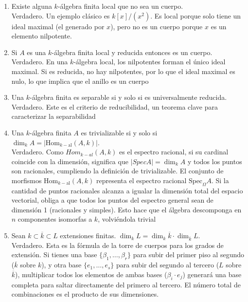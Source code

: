\begin{enumerate}
    Verdadero. Esta afirmación es la conocida ``Fórmula de los puntos'' al hacer un cambio de base a $L$. Dar el morfismo $Hom_{k-alg}(A,L) \simeq Hom_{L-alg}(A\underset{k}{\otimes} L , L)$, y demostrar que $Hom_{k-alg}(A, k) = $ puntos racionales de $A$.  
    \item Existe alguna $k$-álgebra finita local que no sea un cuerpo. \\
    Verdadero. Un ejemplo clásico es $k[x]/(x^2)$. Es local porque solo tiene un ideal maximal (el generado por $x$), pero no es un cuerpo porque $x$ es un elemento nilpotente.
    \item Si $A$ es una $k$-álgebra finita local y reducida entonces es un cuerpo. \\
    Verdadero. En una $k$-álgebra local, los nilpotentes forman el único ideal maximal. Si es reducida, no hay nilpotentes, por lo que el ideal maximal es nulo, lo que implica que el anillo es un cuerpo
    \item Una $k$-álgebra finita es separable si y solo si es universalmente reducida. \\ 
    Verdadero. Este es el criterio de reducibilidad, un teorema clave para caracterizar la separabilidad
    \item Una $k$-álgebra finita $A$ es trivializable si y solo si $\dim_{k}A = |\text{Hom}_{k-\text{al}}(A,k)|$. \\
    Verdadero. Como $Hom_{k-al}(A, k)$ es el espectro racional, si su cardinal coincide con la dimensión, significa que $|Spec A| = \dim_k A$ y todos los puntos son racionales, cumpliendo la definición de trivializable. El conjunto de morfismos $\text{Hom}_{k-\text{al}}(A,k)$ representa el espectro racional $\text{Spec}_{\Omega} A$. Si la cantidad de puntos racionales alcanza a igualar la dimensión total del espacio vectorial, obliga a que todos los puntos del espectro general sean de dimensión 1 (racionales y simples). Esto hace que el álgebra descomponga en $n$ componentes isomorfas a $k$, volviéndola trivial
    \item Sean $k \subset \overline{k} \subset L$ extensiones finitas. $\dim_{k}L = \dim_{k}\overline{k} \cdot \dim_{\overline{k}}L$. \\
    Verdadero. Esta es la fórmula de la torre de cuerpos para los grados de extensión. Si tienes una base $\{\beta_1, \dots, \beta_r\}$ para subir del primer piso al segundo ($\overline{k}$ sobre $k$), y otra base $\{e_1, \dots, e_s\}$ para subir del segundo al tercero ($L$ sobre $\overline{k}$), multiplicar todos los elementos de ambas bases ($\beta_i \cdot e_j$) generará una base completa para saltar directamente del primero al tercero. El número total de combinaciones es el producto de sus dimensiones.

\end{enumerate}
